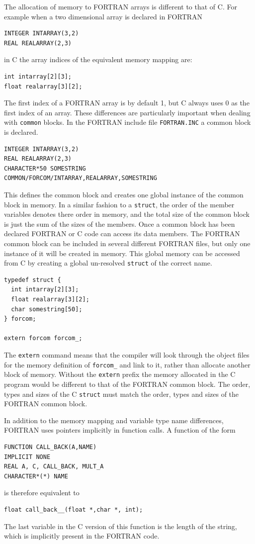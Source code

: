 \documentclass[11pt]{scrartcl}
\begin{document}
The allocation of memory to FORTRAN arrays is different to that of C.
For example when a two dimensional array is declared in FORTRAN
\lstset{language=Fortran}
\begin{lstlisting}
INTEGER INTARRAY(3,2)
REAL REALARRAY(2,3)
\end{lstlisting}
\lstset{language=C}
in C the array indices of the equivalent memory mapping are:
\begin{lstlisting}
int intarray[2][3];
float realarray[3][2];
\end{lstlisting}
The first index of a FORTRAN array is by default 1, but C always uses
0 as the first index of an array.  These differences are particularly
important when dealing with \texttt{common} blocks.  In the FORTRAN
include file \texttt{FORTRAN.INC} a common block is declared.
\lstset{language=Fortran}
\begin{lstlisting}
INTEGER INTARRAY(3,2)
REAL REALARRAY(2,3)
CHARACTER*50 SOMESTRING
COMMON/FORCOM/INTARRAY,REALARRAY,SOMESTRING
\end{lstlisting}
\lstset{language=C}
This defines the common block and creates one global instance of the
common block in memory.  In a similar fashion to a \texttt{struct}, the
order of the member variables denotes there order in memory, and the total
size of the common block is just the sum of the sizes of the members.
Once a common block has been declared FORTRAN or C code can access its
data members.  The FORTRAN common block can be included in several
different FORTRAN files, but only one instance of it will be created
in memory.  This global memory can be accessed from C by creating a
global un-resolved \texttt{struct} of the correct name.
\begin{lstlisting}
typedef struct {
  int intarray[2][3];
  float realarray[3][2];
  char somestring[50];
} forcom;

extern forcom forcom_;
\end{lstlisting}
The \texttt{extern} command means that the compiler will look through
the object files for the memory definition of \texttt{forcom\_} and
link to it, rather than allocate another block of memory.  Without the
\texttt{extern} prefix the memory allocated in the C program would be
different to that of the FORTRAN common block.  The order, types and
sizes of the C \texttt{struct} must match the order, types and sizes of the
FORTRAN common block.

In addition to the memory mapping and variable type name differences,
FORTRAN uses pointers implicitly in function calls.  A function
of the form
\lstset{language=Fortran}
\begin{lstlisting}
FUNCTION CALL_BACK(A,NAME)
IMPLICIT NONE
REAL A, C, CALL_BACK, MULT_A
CHARACTER*(*) NAME
\end{lstlisting}
\lstset{language=C}
is therefore equivalent to
\begin{lstlisting}
float call_back__(float *,char *, int);
\end{lstlisting}
The last variable in the C version of this function is the length of
the string, which is implicitly present in the FORTRAN code.  
\end{document}
